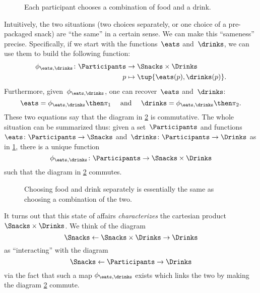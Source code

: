 \begin{figure}[h!]
    \centering
    \caption{Each participant chooses a combination of food and a drink. \label{fig:snacks_2}}
\end{figure}


Intuitively, the two situations (two choices separately, or one choice of a pre-packaged snack) are ``the same'' in a certain sense.
We can make this ``sameness'' precise.
Specifically, if we start with the functions~$\eats$ and~$\drinks$, we can use them to build the following function:
\begin{equation}
    \label{eq:snacks-building-univ-map}
    \begin{aligned}
        \phi_{\eats,\drinks}\colon \Participants&\to \Snacks\times \Drinks\\
        p&\mapsto \tup{\eats(p),\drinks(p)}.
    \end{aligned}
\end{equation}
Furthermore, given~$\phi_{\eats,\drinks}$, one can recover~$\eats$ and~$\drinks$:
\begin{equation}
    \label{eq:snacks-proj-univ-map}
    \eats =\phi_{\eats,\drinks}\then \pi_1 \quad  \text{ and } \quad \drinks=\phi_{\eats,\drinks}\then \pi_2.
\end{equation}
These two equations say that the diagram in \cref{fig:snacks_3} is commutative.
The whole situation can be summarized thus: given a set~$\Participants$ and functions~$\eats\colon \Participants \to \Snacks$ and~$\drinks\colon \Participants \to \Drinks$ as in \cref{fig:snacks_2}, there is a unique function~
\begin{equation}
    \label{eq:snacks-unique-univ-map}
    \phi_{\eats,\drinks} \colon \Participants \to \Snacks \times \Drinks
\end{equation}
such that the diagram in \cref{fig:snacks_3} commutes.

\begin{figure}[h!]
    \centering
    \caption{Choosing food and drink separately is essentially the same as choosing a combination of the two. }
    \label{fig:snacks_3}
\end{figure}

It turns out that this state of affairs \emph{characterizes} the cartesian product $\Snacks\times \Drinks$.
We think of the diagram
\begin{equation}
    \label{eq:snacks-prod-diagram}
    \Snacks \leftarrow \Snacks \times \Drinks \rightarrow \Drinks
\end{equation}
as ``interacting'' with the diagram
\begin{equation}
    \label{eq:snacks-prod-test-diagram}
    \Snacks \leftarrow \Participants \rightarrow \Drinks
\end{equation}
via the fact that such a map $\phi_{\eats,\drinks}$ exists which links the two by making the diagram \cref{fig:snacks_3} commute.

